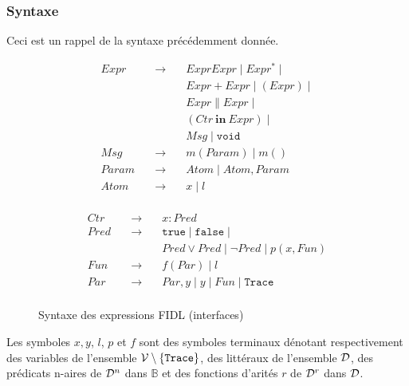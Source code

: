 \subsubsection{Syntaxe}

Ceci est un rappel de la syntaxe pr\'ec\'edemment  donn\'ee.

\begin{figure}[htbp]
\begin{minipage}[t]{.45\textwidth}
    \begin{equation}
\begin{array}{ccl}
        Expr &\quad\rightarrow\quad& Expr Expr \mid Expr^* \mid \\
        && Expr + Expr \mid (Expr) \mid \\
        && Expr \parallel Expr \mid \\
&&(Ctr\ \mathbf{in}\ Expr) \mid \\
        && Msg \mid \mathtt{void}\\
        Msg &\quad\rightarrow\quad& m(Param) \mid m() \\
        Param &\quad\rightarrow\quad& Atom \mid Atom,Param \\
        Atom &\quad\rightarrow\quad& x \mid l \\
\end{array}
\end{equation}
\end{minipage}
\begin{minipage}[t]{.45\textwidth}
    \begin{equation}
\begin{array}{ccl}
Ctr &\quad\rightarrow\quad& x : Pred \\
Pred &\quad\rightarrow\quad& \mathtt{true} \mid \mathtt{false} \mid \\
&&Pred \vee Pred \mid \neg{}Pred \mid p
(x,Fun)  \\
Fun &\quad\rightarrow\quad& f(Par) \mid l \\
Par &\quad\rightarrow\quad& Par,y  \mid y \mid Fun \mid \mathtt{Trace} \\
\end{array}
\end{equation}
\end{minipage}\centering

\caption{Syntaxe des expressions \textsf{FIDL} (interfaces)}
\label{fig-syn-fidl-rappel}
\end{figure}

Les symboles $x,y$, $l$, $p$ et $f$ sont des symboles terminaux
d\'enotant respectivement  des variables de l'ensemble ${\cal
  V}\setminus \{ \mathtt{Trace} \}$, des
litt\'eraux de l'ensemble $\cal D$, des
pr\'edicats n-aires de ${\cal D}^n$ dans $\mathbb{B}$ et des
fonctions d'arit\'es $r$ de ${\cal D}^r$ dans ${\cal D}$.


